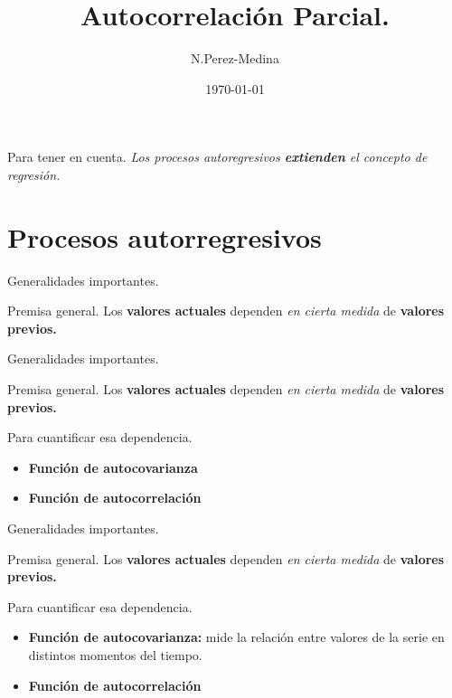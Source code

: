 \documentclass[11pt]{beamer}
\author{N.Perez-Medina}
\title{Autocorrelación Parcial.}
\institute{FING - UACH}
\date{\today}
\begin{document}
\begin{frame}
\titlepage
\end{frame}

\begin{frame}{Para tener en cuenta.}
\centeting
\textit{Los procesos autoregresivos \textbf{extienden} el concepto de regresión.}
\end{frame}

\begin{frame}
\tableofcontents
\end{frame}

\section{Procesos autorregresivos}
\begin{frame}{Generalidades importantes.}
\begin{block}{Premisa general.}
	Los \textbf{valores actuales} dependen \textit{en cierta medida} de \textbf{valores previos.}
\end{block}

\end{frame}

\begin{frame}{Generalidades importantes.}
\begin{block}{Premisa general.}
	Los \textbf{valores actuales} dependen \textit{en cierta medida} de \textbf{valores previos.}
\end{block}

\begin{block}{Para cuantificar esa dependencia.}
	\begin{itemize}
		\item \textbf{Función de autocovarianza}
		\item \textbf{Función de autocorrelación} 
	\end{itemize}
\end{block}
\end{frame}

\begin{frame}{Generalidades importantes.}
\begin{block}{Premisa general.}
	Los \textbf{valores actuales} dependen \textit{en cierta medida} de \textbf{valores previos.}
\end{block}

\begin{block}{Para cuantificar esa dependencia.}
	\begin{itemize}
		\item \textbf{Función de autocovarianza:} mide la relación entre valores de la serie en distintos momentos del tiempo.
		\item \textbf{Función de autocorrelación} 
	\end{itemize}
\end{block}
\end{frame}
\end{document}
